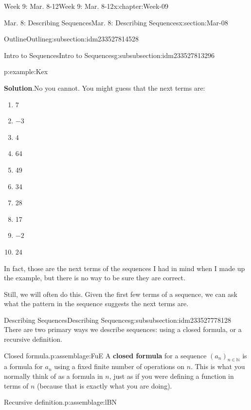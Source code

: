 \documentclass[oneside,10pt,]{book}
\newcommand{\blocktitlefont}{\relax}
\newcommand{\terminology}[1]{\textbf{#1}}
\numberwithin{equation}{section}
\def\N{{\mathbb N}}
\newcommand{\N}{\mathbb N}
\begin{document}
\begin{chapterptx}{Week 9: Mar. 8-12}{}{Week 9: Mar. 8-12}{}{}{x:chapter:Week-09}
\begin{sectionptx}{Mar. 8: Describing Sequences}{}{Mar. 8: Describing Sequences}{}{}{x:section:Mar-08}
\begin{subsectionptx}{Outline}{}{Outline}{}{}{g:subsection:idm233527814528}
\begin{subsubsectionptx}{Intro to Sequences}{}{Intro to Sequences}{}{}{g:subsubsection:idm233527813296}
\begin{example}{}{p:example:Kex}
\begin{enumerate}
\end{enumerate}
%
\par\smallskip%
\noindent\textbf{\blocktitlefont Solution}.\hypertarget{p:solution:OOq}{}\quad{}No you cannot. You might guess that the next terms are:%
\par
%
\begin{multicols}{4}
\begin{enumerate}
\item{}\(\displaystyle 7\)%
\item{}\(\displaystyle -3\)%
\item{}\(\displaystyle 4\)%
\item{}64%
\item{}49%
\item{}34%
\item{}28%
\item{}17%
\item{}\(\displaystyle -2\)%
\item{}\(\displaystyle 24\)%
\end{enumerate}
\end{multicols}
%
\par
In fact, those are the next terms of the sequences I had in mind when I made up the example, but there is no way to be sure they are correct.%
\par
Still, we will often do this. Given the first few terms of a sequence, we can ask what the pattern in the sequence suggests the next terms are.%
\end{example}
\end{subsubsectionptx}
%
%
\typeout{************************************************}
\typeout{************************************************}
%
\begin{subsubsectionptx}{Describing Sequences}{}{Describing Sequences}{}{}{g:subsubsection:idm233527778128}
There are two primary ways we describe sequences: using a closed formula, or a recursive definition.%
\begin{assemblage}{Closed formula.}{p:assemblage:FuE}%
A \terminology{closed formula}  for a sequence \((a_n)_{n\in\N}\) is a formula for \(a_n\) using a fixed finite number of operations on \(n\). This is what you normally think of as a formula in \(n\), just as if you were defining a function in terms of \(n\) (because that is exactly what you are doing).%
\end{assemblage}
\begin{assemblage}{Recursive definition.}{p:assemblage:lBN}%

\end{assemblage}
\end{subsubsectionptx}
\end{subsectionptx}
\end{sectionptx}
\end{chapterptx}
\end{document}
